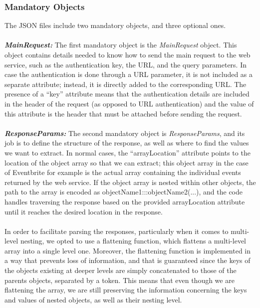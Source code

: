 \subsubsection{Mandatory Objects}
The JSON files include two mandatory objects, and three optional ones.\\\\
\textbf{\textit{MainRequest:}} The first mandatory object is the \emph{MainRequest} object. This object contains details needed to know how to send the main request to the web service, such as the authentication key, the URL, and the query parameters. In case the authentication is done through a URL parameter, it is not included as a separate attribute; instead, it is directly added to the corresponding URL. The presence of a ``key'' attribute means that the authentication details are included in the header of the request (as opposed to URL authentication) and the value of this attribute is the header that must be attached before sending the request.\\\\
\textbf{\textit{ResponseParams:}} The second mandatory object is \emph{ResponseParams}, and its job is to define the structure of the response, as well as where to find the values we want to extract. In normal cases, the ``arrayLocation'' attribute points to the location of the object array so that we can extract; this object array in the case of Eventbrite for example is the actual array containing the individual events returned by the web service. If the object array is nested within other objects, the path to the array is encoded as objectName1:::objectName2(...), and the code handles traversing the response based on the provided arrayLocation attribute until it reaches the desired location in the response.\\\\
In order to facilitate parsing the responses, particularly when it comes to multi-level nesting, we opted to use a flattening function, which flattens a multi-level array into a single level one. Moreover, the flattening function is implemented in a way that prevents loss of information, and that is guaranteed since the keys of the objects existing at deeper levels are simply concatenated to those of the parents objects, separated by a token. This means that even though we are flattening the array, we are still preserving the information concerning the keys and values of nested objects, as well as their nesting level.\\\\
